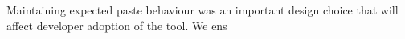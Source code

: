 \documentclass[../manifest.tex]{subfiles}
\begin{document}
Maintaining expected paste behaviour was an important design choice that will affect developer adoption of the tool. We ens%
%
%
\end{document}
